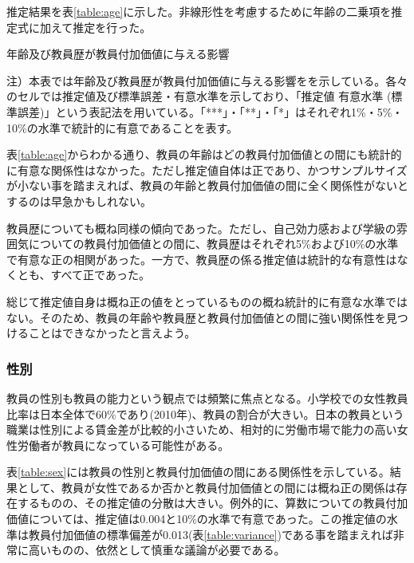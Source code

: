 \documentclass[a4paper,12pt]{article}
\begin{document}
推定結果を表\ref{table:age}に示した。非線形性を考慮するために年齢の二乗項を推定式に加えて推定を行った。

\begin{table}[htbp]
\begin{adjustbox}{max width=1\textwidth}

\end{adjustbox}
\caption{年齢及び教員歴が教員付加価値に与える影響}
\label{table:age}
\begin{flushleft}
\footnotesize{
注）本表では年齢及び教員歴が教員付加価値に与える影響をを示している。各々のセルでは推定値及び標準誤差・有意水準を示しており、「推定値 有意水準 (標準誤差)」という表記法を用いている。「***」・「**」・「*」はそれぞれ1\%・5\%・ 10\%の水準で統計的に有意であることを表す。
}
\end{flushleft}
\end{table}

表\ref{table:age}からわかる通り、教員の年齢はどの教員付加価値との間にも統計的に有意な関係性はなかった。ただし推定値自体は正であり、かつサンプルサイズが小ない事を踏まえれば、教員の年齢と教員付加価値の間に全く関係性がないとするのは早急かもしれない。

教員歴についても概ね同様の傾向であった。ただし、自己効力感および学級の雰囲気についての教員付加価値との間に、教員歴はそれぞれ5\%および10\%の水準で有意な正の相関があった。一方で、教員歴の係る推定値は統計的な有意性はなくとも、すべて正であった。

総じて推定値自身は概ね正の値をとっているものの概ね統計的に有意な水準ではない。そのため、教員の年齢や教員歴と教員付加価値との間に強い関係性を見つけることはできなかったと言えよう。

\subsubsection*{性別}

教員の性別も教員の能力という観点では頻繁に焦点となる。小学校での女性教員比率は日本全体で60\%であり(2010年)、教員の割合が大きい。日本の教員という職業は性別による賃金差が比較的小さい\citep{senoo2003}ため、相対的に労働市場で能力の高い女性労働者が教員になっている可能性がある。

表\ref{table:sex}には教員の性別と教員付加価値の間にある関係性を示している。結果として、教員が女性であるか否かと教員付加価値との間には概ね正の関係は存在するものの、その推定値の分散は大きい。例外的に、算数についての教員付加価値については、推定値は0.004と10\%の水準で有意であった。この推定値の水準は教員付加価値の標準偏差が0.013(表\ref{table:variance})である事を踏まえれば非常に高いものの、依然として慎重な議論が必要である。
\end{document}
